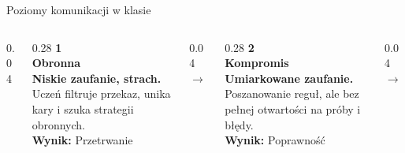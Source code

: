 \documentclass[10pt, aspectratio=169]{beamer}
\begin{document}
\begin{frame}{Poziomy komunikacji w klasie}
    \vspace{0.4cm}
    \begin{columns}[T]
        \begin{column}{0.04\textwidth}
        \end{column}
        
        \begin{column}{0.28\textwidth}
            {\fontsize{55}{55}\selectfont\sffamily\bfseries\textcolor{accentCoral!15}{1}}\\[-0.8cm]
            {\large\bfseries\textcolor{accentCoral}{Obronna}}\\[0.3cm]
            \footnotesize\textcolor{textPrimary}{\textbf{Niskie zaufanie, strach.}}\\
            Uczeń filtruje przekaz, unika kary i szuka strategii obronnych.\\[0.4cm]
            \normalsize\textbf{\textcolor{textPrimary}{Wynik:}} \textcolor{accentCoral}{Przetrwanie}
        \end{column}
        
        \begin{column}{0.04\textwidth}
            \vspace{1.5cm}
            \centering\textcolor{cardBorder}{\large $\rightarrow$}
        \end{column}
        
        \begin{column}{0.28\textwidth}
            {\fontsize{55}{55}\selectfont\sffamily\bfseries\textcolor{primaryNavy!10}{2}}\\[-0.8cm]
            {\large\bfseries\textcolor{primaryNavy}{Kompromis}}\\[0.3cm]
            \footnotesize\textcolor{textPrimary}{\textbf{Umiarkowane zaufanie.}}\\
            Poszanowanie reguł, ale bez pełnej otwartości na próby i błędy.\\[0.4cm]
            \normalsize\textbf{\textcolor{textPrimary}{Wynik:}} \textcolor{primaryNavy}{Poprawność}
        \end{column}
        
        \begin{column}{0.04\textwidth}
            \vspace{1.5cm}
            \centering\textcolor{cardBorder}{\large $\rightarrow$}
        \end{column}


\end{columns}
\end{frame}
\end{document}
